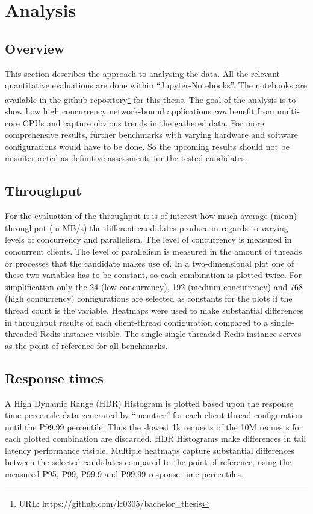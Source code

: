 \section{Analysis}
\subsection{Overview}
This section describes the approach to analysing the data. All the relevant quantitative evaluations are done within “Jupyter-Notebooks”. The notebooks are available in the github repository\footnote{URL: https://github.com/lc0305/bachelor\_thesis} for this thesis.  \newline
The goal of the analysis is to show how high concurrency network-bound applications \textit{can} benefit from multi-core CPUs and capture obvious trends in the gathered data.
For more comprehensive results, further benchmarks with varying hardware and software configurations would have to be done. So the upcoming results should not be misinterpreted as definitive assessments for the tested candidates.
\subsection{Throughput}
For the evaluation of the throughput it is of interest how much average (mean) throughput (in MB/s) the different candidates produce in regards to varying levels of concurrency and parallelism. The level of concurrency is measured in concurrent clients. The level of parallelism is measured in the amount of threads or processes that the candidate makes use of. In a two-dimensional plot one of these two variables has to be constant, so each combination is plotted twice. For simplification only the 24 (low concurrency), 192 (medium concurrency) and 768 (high concurrency) configurations are selected as constants for the plots if the thread count is the variable. \newline
Heatmaps were used to make substantial differences in throughput results of each client-thread configuration compared to a single-threaded Redis instance visible. The single single-threaded Redis instance serves as the point of reference for all benchmarks.
\subsection{Response times}
A High Dynamic Range (HDR) Histogram is plotted based upon the response time percentile data generated by “memtier” for each client-thread configuration until the P99.99 percentile. Thus the slowest 1k requests of the 10M requests for each plotted combination are discarded. HDR Histograms make differences in tail latency performance visible.
Multiple heatmaps capture substantial differences between the selected candidates compared to the point of reference, using the measured P95, P99, P99.9 and P99.99 response time percentiles.

